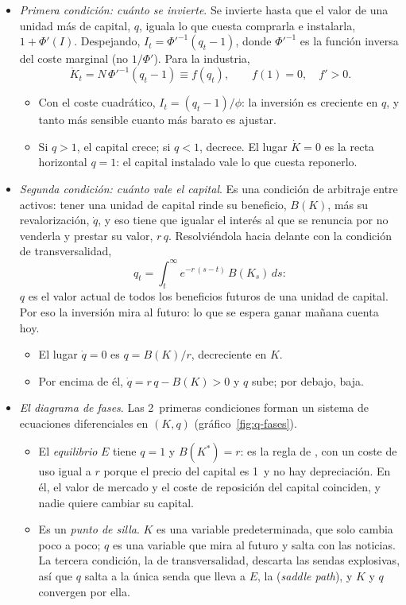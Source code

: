 \documentclass[11pt]{article}
\begin{document}
\begin{itemize}
\item \emph{Primera condición: cuánto se invierte}. Se invierte hasta que el valor de una unidad más de capital, $q$, iguala lo que cuesta comprarla e instalarla, $1+\Phi'({I})$. Despejando, $I_t=\Phi'^{-1}(q_t-1)$, donde $\Phi'^{-1}$ es la función inversa del coste marginal (no $1/\Phi'$). Para la industria,
  \begin{equation*}
  \dot K_t=N\,\Phi'^{-1}(q_t-1)\equiv f(q_t),\qquad f(1)=0,\quad f'>0.
  \end{equation*}
  \begin{itemize}
  \item Con el coste cuadrático, $I_t=(q_t-1)/\phi$: la inversión es creciente en $q$, y tanto más sensible cuanto más barato es ajustar.
  \item Si $q>1$, el capital crece; si $q<1$, decrece. El lugar $\dot K=0$ es la recta horizontal $q=1$: el capital instalado vale lo que cuesta reponerlo.
  \end{itemize}
\item \emph{Segunda condición: cuánto vale el capital}. Es una condición de arbitraje entre activos: tener una unidad de capital rinde su beneficio, $B(K)$, más su revalorización, $\dot q$, y eso tiene que igualar el interés al que se renuncia por no venderla y prestar su valor, $r\,q$. Resolviéndola hacia delante con la condición de transversalidad,
  \begin{equation*}
  q_t=\int_t^{\infty}e^{-r\,(s-t)}\,B(K_s)\,ds:
  \end{equation*}
  $q$ es el valor actual de todos los beneficios futuros de una unidad de capital. Por eso la inversión mira al futuro: lo que se espera ganar mañana cuenta hoy.
  \begin{itemize}
  \item El lugar $\dot q=0$ es $q=B(K)/r$, decreciente en $K$.
  \item Por encima de él, $\dot q=r\,q-B(K)>0$ y $q$ sube; por debajo, baja.
  \end{itemize}
\item \emph{El diagrama de fases}. Las 2~primeras condiciones forman un sistema de ecuaciones diferenciales en $(K,q)$ (gráfico~\ref{fig:q-fases}).
  \begin{itemize}
  \item El \emph{equilibrio} $E$ tiene $q=1$ y $B(K^*)=r$: es la regla de , con un coste de uso igual a $r$ porque el precio del capital es 1~y no hay depreciación. En él, el valor de mercado y el coste de reposición del capital coinciden, y nadie quiere cambiar su capital.
  \item Es un \emph{punto de silla}. $K$ es una variable predeterminada, que solo cambia poco a poco; $q$ es una variable que mira al futuro y salta con las noticias. La tercera condición, la de transversalidad, descarta las sendas explosivas, así que $q$ salta a la única senda que lleva a $E$, la  (\emph{saddle path}), y $K$ y $q$ convergen por ella.
  \end{itemize}
\end{itemize}
\end{document}
